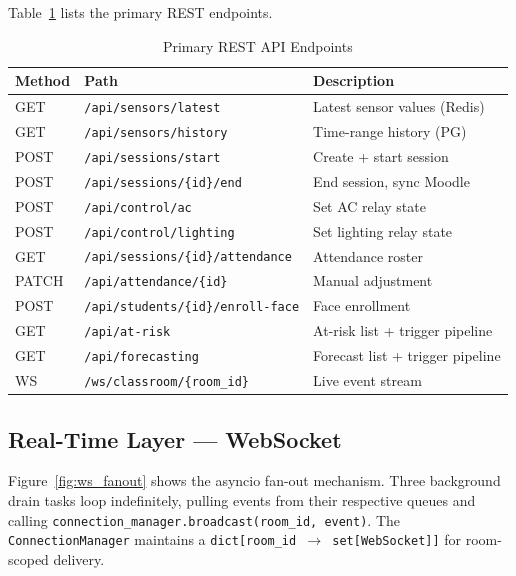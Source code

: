 Table~\ref{tab:api_endpoints} lists the primary REST endpoints.

\begin{table}[H]
\centering
\caption{Primary REST API Endpoints}
\label{tab:api_endpoints}
\begin{tabular}{@{}p{0.8cm}p{3.8cm}p{2.9cm}@{}}
\toprule
\textbf{Method} & \textbf{Path} & \textbf{Description} \\
\midrule
GET  & \texttt{/api/sensors/latest}            & Latest sensor values (Redis) \\
GET  & \texttt{/api/sensors/history}           & Time-range history (PG) \\
POST & \texttt{/api/sessions/start}            & Create + start session \\
POST & \texttt{/api/sessions/\{id\}/end}       & End session, sync Moodle \\
POST & \texttt{/api/control/ac}                & Set AC relay state \\
POST & \texttt{/api/control/lighting}          & Set lighting relay state \\
GET  & \texttt{/api/sessions/\{id\}/attendance}& Attendance roster \\
PATCH& \texttt{/api/attendance/\{id\}}         & Manual adjustment \\
POST & \texttt{/api/students/\{id\}/enroll-face}& Face enrollment \\
GET  & \texttt{/api/at-risk}                   & At-risk list + trigger pipeline \\
GET  & \texttt{/api/forecasting}               & Forecast list + trigger pipeline \\
WS   & \texttt{/ws/classroom/\{room\_id\}}     & Live event stream \\
\bottomrule
\end{tabular}
\end{table}

\subsection{Real-Time Layer — WebSocket}
\label{subsec:websocket}

Figure~\ref{fig:ws_fanout} shows the asyncio fan-out mechanism.  Three
background drain tasks loop indefinitely, pulling events from their
respective queues and calling \texttt{connection\_manager.broadcast(room\_id,
event)}.  The \texttt{ConnectionManager} maintains a
\texttt{dict[room\_id $\rightarrow$ set[WebSocket]]} for room-scoped
delivery.

